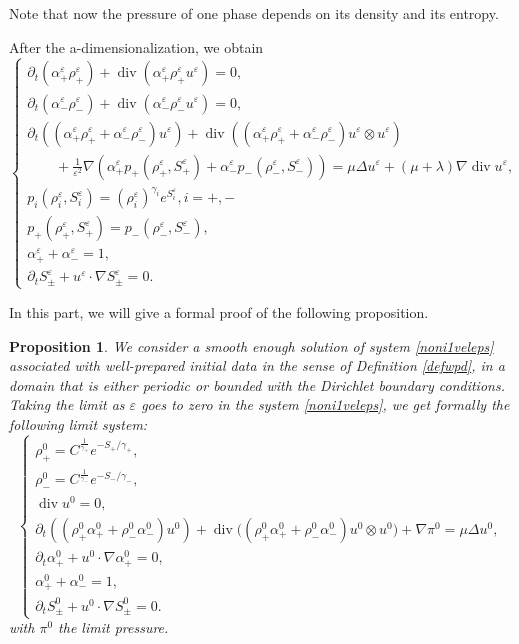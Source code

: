 \documentclass[11pt, twoside, a4paper]{article}
\theoremstyle{plain}
\newtheorem{proposition}[theorem]{Proposition}
\theoremstyle{remark}
\numberwithin{equation}{section}
\renewcommand{\div}{\operatorname{div}}
\renewcommand{\epsilon}{\varepsilon}
\newcommand{\dt}{\partial_t}
\newcommand{\eps}{\varepsilon}
\newcommand{\ap}{\alpha_+}
\newcommand{\am}{\alpha_-}
\newcommand{\rp}{\rho_+}
\newcommand{\rmi}{\rho_-}
\newcommand{\gp}{\gamma_{+}}
\newcommand{\gm}{\gamma_-}
\begin{document}
Note that now the pressure of one phase depends on its density and its entropy.

After the a-dimensionalization, we obtain
\begin{equation}\label{noni1veleps}
    \begin{cases}
            \partial_t (\alpha_+^{\epsilon} \rho_+^{\epsilon}) + \div(\alpha_+^{\epsilon}\rho_+^{\epsilon}u^{\epsilon}) = 0,\\
            \partial_t (\alpha_-^{\epsilon} \rho_-^{\epsilon}) + \div(\alpha_-^{\epsilon}\rho_-^{\epsilon}u^{\epsilon}) = 0,\\
            \partial_t ((\alpha_+^{\epsilon} \rho_+^{\epsilon} + \alpha_-^{\epsilon}\rho_-^{\epsilon})u^{\epsilon}) + \div((\alpha_+^{\epsilon}\rho_+^{\epsilon} + \alpha_-^{\epsilon}\rho_-^{\epsilon})u^{\epsilon}\otimes u^{\epsilon})\\
            \quad \quad + \frac{1}{\epsilon^2} \nabla (\alpha_+^{\epsilon}p_+(\rho_+^{\epsilon},S_+^\eps)+\alpha_-^{\epsilon}p_-(\rho_-^{\epsilon},S_-^\eps)) = \mu \Delta u^{\epsilon} + (\mu + \lambda)\nabla \div u^{\epsilon},\\
            p_i(\rho_i^{\epsilon},S_i^\eps) = (\rho_i^{\epsilon})^{\gamma_i} e^{S_i^\eps}, i=+,-\\
            p_+(\rho_+^{\epsilon},S_+^\eps) = p_-(\rho_-^{\epsilon},S_-^\eps),\\
            \alpha_+^{\epsilon} + \alpha_-^{\epsilon} = 1,\\
            \dt S_\pm^\eps + u^\eps \cdot \nabla S_\pm^\eps = 0.
    \end{cases}
\end{equation}

In this part, we will give a formal proof of the following proposition.

\begin{proposition} 
We consider a smooth enough solution of system \eqref{noni1veleps} associated with well-prepared initial data in the sense of Definition \eqref{defwpd}, in a domain that is either periodic or bounded with the Dirichlet boundary conditions. Taking the limit as $\eps$ goes to zero in the system \eqref{noni1veleps}, we get formally the following limit system:
\begin{equation*}
    \begin{cases}
        \rp^0 = C^{\frac{1}{\gp}} e^{-S_+/\gp},\\
        \rmi^0 = C^{\frac{1}{\gm}} e^{-S_-/\gm},\\
        \div u^0 = 0,\\
         \dt \left( \left(\rp^0 \ap^0 + \rmi^0 \am^0 \right) u^0\right) + \div \Big( \left(\rp^0 \ap^0 + \rmi^0 \am^0 \right) u^0\otimes  u^0\Big) + \nabla \pi^0 = \mu \Delta u^0,\\
        \dt \ap^0 + u^0 \cdot \nabla \ap^0 =0,\\
        \ap^0 + \am^0 = 1,\\
        \dt S_\pm^0 + u^0 \cdot \nabla S_\pm^0=0.
    \end{cases}
\end{equation*}
with $\pi^0$ the limit pressure.
\end{proposition}
\end{document}
